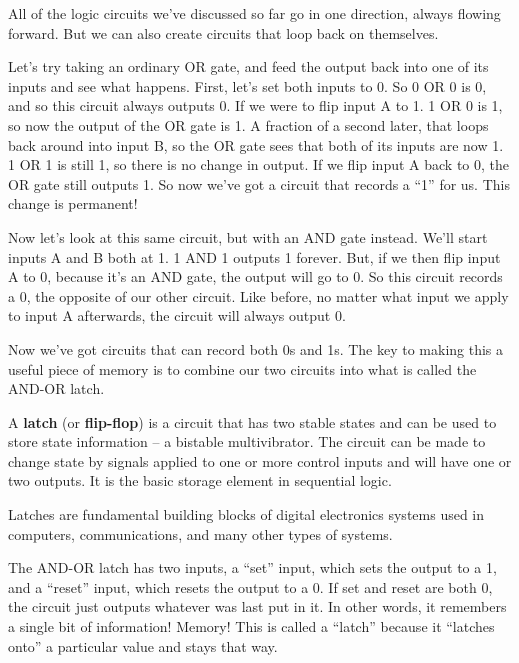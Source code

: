All of the logic circuits we've discussed so far go in one direction, always flowing forward. But we can also create
circuits that loop back on themselves.

\be
Let's try taking an ordinary OR gate, and feed the output back into one of its inputs and see what happens. First,
let's set both inputs to 0. So 0 OR 0 is 0, and so this circuit always outputs 0. If we were to flip input A to 1. 1
OR 0 is 1, so now the output of the OR gate is 1. A fraction of a second later, that loops back around into input B,
so the OR gate sees that both of its inputs are now 1. 1 OR 1 is still 1, so there is no change in output. If we flip
input A back to 0, the OR gate still outputs 1. So now we've got a circuit that records a ``1'' for us. This change
is permanent!

\ee

\be
Now let's look at this same circuit, but with an AND gate instead. We'll start inputs A and B both at 1. 1 AND 1
outputs 1 forever. But, if we then flip input A to 0, because it's an AND gate, the output will go to 0. So this
circuit records a 0, the opposite of our other circuit. Like before, no matter what input we apply to input A
afterwards, the circuit will always output 0.

\ee

Now we've got circuits that can record both 0s and 1s. The key to making this a useful piece of memory is to combine
our two circuits into what is called the AND-OR latch.

A \textbf{latch} (or \textbf{flip-flop}) is a circuit that has two stable states and can be used to store state
information – a bistable multivibrator. The circuit can be made to change state by signals applied to one or more
control inputs and will have one or two outputs. It is the basic storage element in sequential logic.
\ed

Latches are fundamental building blocks of digital electronics systems used in computers, communications, and many
other types of systems.

\be
The AND-OR latch has two inputs, a ``set'' input, which sets the output to a 1, and a ``reset'' input, which resets the
output to a 0. If set and reset are both 0, the circuit just outputs whatever was last put in it. In other words, it
remembers a single bit of information! Memory! This is called a ``latch'' because it ``latches onto'' a particular
value and stays that way.

